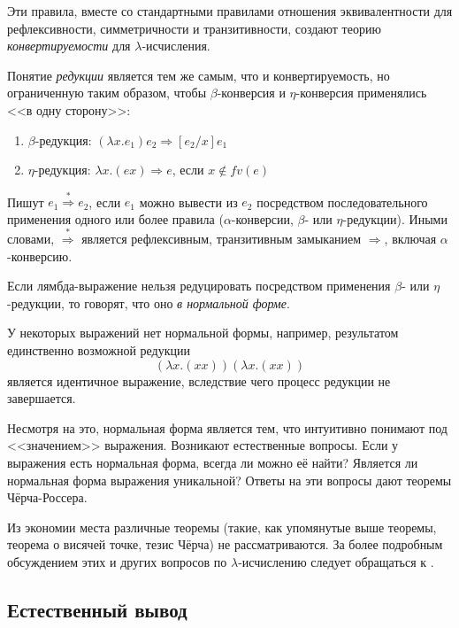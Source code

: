 Эти правила, вместе со стандартными правилами отношения эквивалентности для рефлексивности, симметричности и транзитивности, создают теорию \emph{конвертируемости} для $\lambda$-исчисления.

Понятие \emph{редукции} является тем же самым, что и конвертируемость, но ограниченную таким образом, чтобы $\beta$-конверсия и $\eta$-конверсия применялись <<в одну сторону>>:

\begin{enumerate}
\item $\beta$-редукция: $(\lambda x.e_1)e_2 \Rightarrow [e_2/x]e_1$
\item $\eta$-редукция: $\lambda x.(e x) \Rightarrow e$, если $x \notin fv(e)$
\end{enumerate}

Пишут $e_1 \overset{*}{\Rightarrow} e_2$, если $e_1$ можно вывести из $e_2$ посредством последовательного применения одного или более правила ($\alpha$-конверсии, $\beta$- или $\eta$-редукции). Иными словами, $\overset{\ast}{\Rightarrow}$ является рефлексивным, транзитивным замыканием $\Rightarrow$, включая $\alpha$-конверсию.

Если лямбда-выражение нельзя редуцировать посредством применения $\beta$- или $\eta$-редукции, то говорят, что оно \emph{в нормальной форме}.

У некоторых выражений нет нормальной формы, например, результатом единственно возможной редукции
\begin{equation*}
(\lambda x. (x x))(\lambda x. (x x))
\end{equation*}
является идентичное выражение, вследствие чего процесс редукции не завершается.

Несмотря на это, нормальная форма является тем, что интуитивно понимают под <<значением>> выражения. Возникают естественные вопросы. Если у выражения есть нормальная форма, всегда ли можно её найти? Является ли нормальная форма выражения уникальной? Ответы на эти вопросы дают теоремы Чёрча-Россера.

Из экономии места различные теоремы (такие, как упомянутые выше теоремы, теорема о висячей точке, тезис Чёрча) не рассматриваются. За более подробным обсуждением этих и других вопросов по $\lambda$-исчислению следует обращаться к \cite{barendregt1984lambda}.

\subsection{Естественный вывод}
\label{sec:logic}

